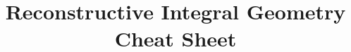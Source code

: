 \documentclass[14pt]{extarticle}
\title{Reconstructive Integral Geometry Cheat Sheet}
\begin{document}
	\maketitle	
	\begin{outline}		
	
	\end{outline}
\end{document}
